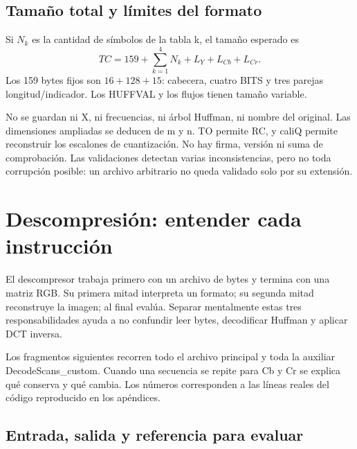 \documentclass[11pt,a4paper,oneside]{report}
\begin{document}
\section{Tamaño total y límites del formato}

Si $N_k$ es la cantidad de símbolos de la tabla k, el tamaño esperado es
\[
TC=159+\sum_{k=1}^{4}N_k+L_Y+L_{Cb}+L_{Cr}.
\]
Los 159 bytes fijos son $16+128+15$: cabecera, cuatro BITS y tres parejas
longitud/indicador. Los HUFFVAL y los flujos tienen tamaño variable.

No se guardan ni X, ni frecuencias, ni árbol Huffman, ni nombre del original.
Las dimensiones ampliadas se deducen de m y n. TO permite RC, y caliQ permite
reconstruir los escalones de cuantización. No hay firma, versión ni suma de
comprobación. Las validaciones detectan varias inconsistencias, pero no toda
corrupción posible: un archivo arbitrario no queda validado solo por su extensión.


\chapter{Descompresión: entender cada instrucción}

El descompresor trabaja primero con un archivo de bytes y termina con una
matriz RGB. Su primera mitad interpreta un formato; su segunda mitad reconstruye
la imagen; al final evalúa. Separar mentalmente estas tres responsabilidades
ayuda a no confundir leer bytes, decodificar Huffman y aplicar DCT inversa.

Los fragmentos siguientes recorren todo el archivo principal y toda la auxiliar
DecodeScans\_custom. Cuando una secuencia se repite para Cb y Cr se explica
qué conserva y qué cambia. Los números corresponden a las líneas reales
del código reproducido en los apéndices.

\section{Entrada, salida y referencia para evaluar}
\end{document}
